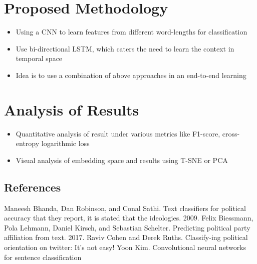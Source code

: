 \documentclass[final]{beamer}
\begin{document}
\begin{frame}[t]
\begin{multicols}{3}
\section{Proposed Methodology}

\begin{itemize}
  \item Using a CNN to learn features from different word-lengths for classification
  \item Use bi-directional LSTM, which caters the need to learn the context in temporal space
  \item Idea is to use a combination of above approaches in an end-to-end learning
\end{itemize}

\section{Analysis of Results}
\begin{itemize}
    \item Quantitative analysis of result under various metrics like F1-score, cross-entropy logarithmic loss
    \item Visual analysis of embedding space and results using T-SNE or PCA
\end{itemize}



\subsection{References}
\begin{thebibliography}{99}
 Maneesh Bhanda, Dan Robinson, and Conal Sathi. Text classifiers for political accuracy that they report, it is stated that the ideologies. 2009.
 Felix Biessmann, Pola Lehmann, Daniel Kirsch, and Sebastian Schelter. Predicting political party affiliation from text. 2017.
 Raviv Cohen and Derek Ruths. Classify-ing political orientation on twitter: It’s not easy!
 Yoon Kim. Convolutional neural networks for sentence classification

\end{thebibliography}
\end{multicols}

\end{frame}
\end{document}

